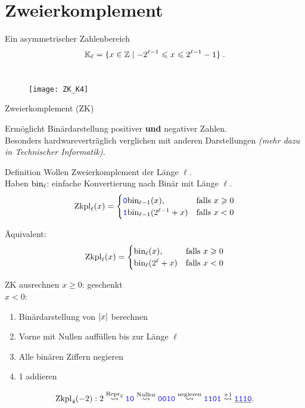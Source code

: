 \section{Zweierkomplement}

\begin{frame}{Ein asymmetrischer Zahlenbereich}
	\[
	\mathbb{K}_{\ell} = \{ x\in \mathbb{Z} \mid -2^{\ell-1} \leqslant x \leqslant 2^{\ell-1} -1 \} \;.
	\]
	\\[0.2cm]
	
	\begin{figure}
		\centering
		\texttt{[image: ZK\_K4]}
	\end{figure}
	
\end{frame}

\begin{frame}{Zweierkomplement (ZK)}
	
	Ermöglicht Binärdarstellung positiver \textbf{und} negativer Zahlen. \\
	Besonders hardwareverträglich verglichen mit anderen Darstellungen \textit{(mehr dazu in Technischer Informatik)}.

	\begin{block}{Definition}
		Wollen Zweierkomplement der Länge $\ell$. \\ Haben $\text{bin}_\ell$: einfache Konvertierung nach Binär mit Länge $\ell$.
		$$\text{Zkpl}_\ell(x) = \begin{cases} \hbox{\textcolor{blue}{\texttt{0}}} \text{bin}_{\ell-1}(x), & \text{falls } x \geqslant 0 \\ 
										 \hbox{\textcolor{blue}{\texttt{1}}} \text{bin}_{\ell-1}(2^{\ell-1}+x) & \text{falls } x < 0\end{cases}$$
		
		Äquivalent:
		$$\text{Zkpl}_\ell(x) = \begin{cases} \text{bin}_{\ell}(x), & \text{falls } x \geqslant 0 \\ 
										 \text{bin}_{\ell}(2^{\ell}+x) & \text{falls } x < 0\end{cases}$$
	\end{block}
\end{frame}

\begin{frame}{ZK ausrechnen}
	$x \geq 0$: geschenkt \smiley \\
	$x < 0$:
	\begin{enumerate}
		\item Binärdarstellung von $\left\lvert x \right\rvert$ berechnen
		\item Vorne mit Nullen auffüllen bis zur Länge $\ell$
		\item Alle binären Ziffern negieren
		\item 1 addieren
	\end{enumerate}
	
	\begin{Beispiel}
		 $$\fZkpl_4(-2): 2 \stackrel{\fRepr_2}{\?>} \word{10} \stackrel{\text{Nullen}}{\?>} \word{0010} \stackrel{\text{negieren}}{\?>} \word{1101} \stackrel{+1}{\?>} \underline{\word{1110}}. $$
	\end{Beispiel}
\end{frame}

